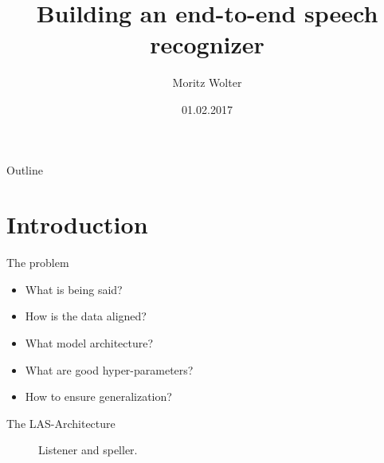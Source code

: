 \documentclass[10pt]{beamer}
\title{Building an end-to-end speech recognizer}
\author{Moritz Wolter}
\date{01.02.2017}
\begin{document}
\begin{frame}
  \titlepage
\end{frame}


\begin{frame}{Outline}
  \tableofcontents
\end{frame}

\section{Introduction}
\begin{frame}{The problem}
	\begin{itemize}
		\item What is being said?
		\item How is the data aligned?
		\item What model architecture?
		\item What are good hyper-parameters?
		\item How to ensure generalization?
	\end{itemize}
\end{frame}

\begin{frame}{The LAS-Architecture}
	\begin{figure}
		\caption{Listener and speller.}
	\end{figure}
\end{frame}
\end{document}
